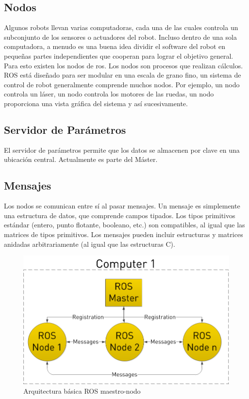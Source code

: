 \subsection{Nodos}
Algunos robots llevan varias computadoras, cada una de las cuales controla un subconjunto de los sensores o actuadores del robot. Incluso dentro de una sola computadora, a menudo es una buena idea dividir el software del robot en pequeñas partes independientes que cooperan para lograr el objetivo general. Para esto existen los nodos de ros.
Los nodos son procesos que realizan cálculos. ROS está diseñado para ser modular en una escala de grano fino, un sistema de control de robot generalmente comprende muchos nodos.
Por ejemplo, un nodo controla un láser, un nodo controla los motores de las ruedas, un nodo proporciona una vista gráfica del sistema y así sucesivamente.

\subsection{Servidor de Parámetros}
El servidor de parámetros permite que los datos se almacenen por clave en una ubicación central. Actualmente es parte del Máster.

\subsection{Mensajes}
Los nodos se comunican entre sí al pasar mensajes. Un mensaje es simplemente una estructura de datos, que comprende campos tipados. Los tipos primitivos estándar (entero, punto flotante, booleano, etc.) son compatibles, al igual que las matrices de tipos primitivos. Los mensajes pueden incluir estructuras y matrices anidadas arbitrariamente (al igual que las estructuras C).

\begin{figure}[H]
    \centering
    \includegraphics[scale=0.45]{img/ros-architecture.png}
  	\caption{Arquitectura básica ROS maestro-nodo}
  	\label{fig:ros-arch}
\end{figure}

